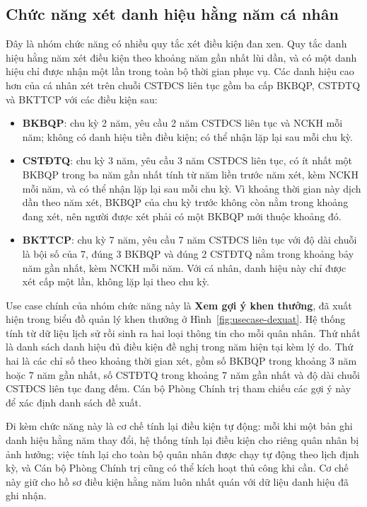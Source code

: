 \documentclass[../DoAn.tex]{subfiles}
\begin{document}
\subsection{Chức năng xét danh hiệu hằng năm cá nhân}
\label{subsection:2.2.5}

Đây là nhóm chức năng có nhiều quy tắc xét điều kiện đan xen.
Quy tắc danh hiệu hằng năm xét điều kiện theo khoảng năm gần nhất lùi dần, và có một danh hiệu chỉ được nhận một lần trong toàn bộ thời gian phục vụ.
Các danh hiệu cao hơn của cá nhân xét trên chuỗi CSTĐCS liên tục gồm ba cấp BKBQP, CSTĐTQ và BKTTCP với các điều kiện sau:

\begin{itemize}
    \item \textbf{BKBQP}: chu kỳ 2 năm, yêu cầu 2 năm CSTĐCS liên tục và NCKH mỗi năm; không có danh hiệu tiền điều kiện; có thể nhận lặp lại sau mỗi chu kỳ.
    \item \textbf{CSTĐTQ}: chu kỳ 3 năm, yêu cầu 3 năm CSTĐCS liên tục, có ít nhất một BKBQP trong ba năm gần nhất tính từ năm liền trước năm xét, kèm NCKH mỗi năm, và có thể nhận lặp lại sau mỗi chu kỳ. Vì khoảng thời gian này dịch dần theo năm xét, BKBQP của chu kỳ trước không còn nằm trong khoảng đang xét, nên người được xét phải có một BKBQP mới thuộc khoảng đó.
    \item \textbf{BKTTCP}: chu kỳ 7 năm, yêu cầu 7 năm CSTĐCS liên tục với độ dài chuỗi là bội số của 7, đúng 3 BKBQP và đúng 2 CSTĐTQ nằm trong khoảng bảy năm gần nhất, kèm NCKH mỗi năm. Với cá nhân, danh hiệu này chỉ được xét cấp một lần, không lặp lại theo chu kỳ.
\end{itemize}

Use case chính của nhóm chức năng này là \textbf{Xem gợi ý khen thưởng}, đã xuất hiện trong biểu đồ quản lý khen thưởng ở Hình~\ref{fig:usecase-dexuat}.
Hệ thống tính từ dữ liệu lịch sử rồi sinh ra hai loại thông tin cho mỗi quân nhân.
Thứ nhất là danh sách danh hiệu đủ điều kiện đề nghị trong năm hiện tại kèm lý do.
Thứ hai là các chỉ số theo khoảng thời gian xét, gồm số BKBQP trong khoảng 3 năm hoặc 7 năm gần nhất, số CSTĐTQ trong khoảng 7 năm gần nhất và độ dài chuỗi CSTĐCS liên tục đang đếm.
Cán bộ Phòng Chính trị tham chiếu các gợi ý này để xác định danh sách đề xuất.

Đi kèm chức năng này là cơ chế tính lại điều kiện tự động: mỗi khi một bản ghi danh hiệu hằng năm thay đổi, hệ thống tính lại điều kiện cho riêng quân nhân bị ảnh hưởng; việc tính lại cho toàn bộ quân nhân được chạy tự động theo lịch định kỳ, và Cán bộ Phòng Chính trị cũng có thể kích hoạt thủ công khi cần. Cơ chế này giữ cho hồ sơ điều kiện hằng năm luôn nhất quán với dữ liệu danh hiệu đã ghi nhận.
\end{document}
